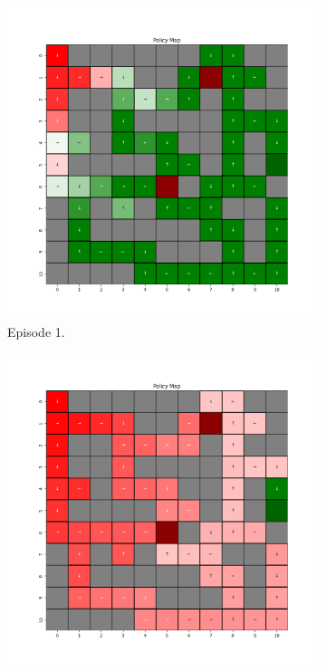 \documentclass{assignment}
\begin{document}
\begin{figure}[H]
    \begin{subfigure}{0.3\textwidth}
        \includegraphics[width=\textwidth]{figures/policy_q/epsilon_sweep/policy_alpha_0.1_gamma_0.95_epsilon_0.8_iteration_1.png}
    \caption{Episode 1.}
    \end{subfigure}\hfill
    \begin{subfigure}{0.3\textwidth}
        \includegraphics[width=\textwidth]{figures/policy_q/epsilon_sweep/policy_alpha_0.1_gamma_0.95_epsilon_0.8_iteration_50.png}

\end{subfigure}
\end{figure}
\end{document}
